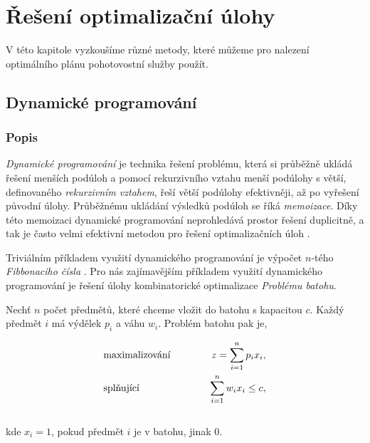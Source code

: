 \chapter{Řešení optimalizační úlohy}\label{chap:reseniOptUloh}

V této kapitole vyzkoušíme různé metody, které můžeme pro nalezení optimálního plánu pohotovostní služby použít.

\section{Dynamické programování}\label{kap:dynamicProgram}

\subsection{Popis}

\textit{Dynamické programování} je technika řešení problému, která si průběžně ukládá řešení menších podúloh a pomocí rekurzivního vztahu menší podúlohy s větší,
definovaného \textit{rekurzivním vztahem}, řeší větší podúlohy efektivněji, až po vyřešení původní úlohy. 
Průběžnému ukládání výsledků podúloh se říká \textit{memoizace}.
Díky této memoizaci dynamické programování neprohledává prostor řešení duplicitně, a tak je často velmi efektivní metodou pro řešení optimalizačních úloh \cite{dynamic}.

Triviálním příkladem využití dynamického programování je výpočet $n$-tého \textit{Fibbonaciho čísla} \cite{mares}.
Pro nás zajímavějším příkladem využití dynamického programování je řešení úlohy kombinatorické optimalizace \textit{Problému batohu}.

\begin{definice}
  Nechť $n$ počet předmětů, které chceme vložit do batohu s kapacitou $c$.
  Každý předmět $i$ má výdělek $p_i$ a váhu $w_i$. Problém batohu pak je,

  \begin{alignat*}{2}
    &\normalfont \text{maximalizování} \hspace{30pt} &z = \sum_{i=1}^n p_i x_i, \\
    &\normalfont \text{splňující}   \hspace{30pt} &\sum_{i = 1}^{n} w_i x_i \leq c,
  \end{alignat*}
  \\
  kde $x_i = 1$, pokud předmět $i$ je v batohu, jinak $0$.
  \\
\end{definice}

